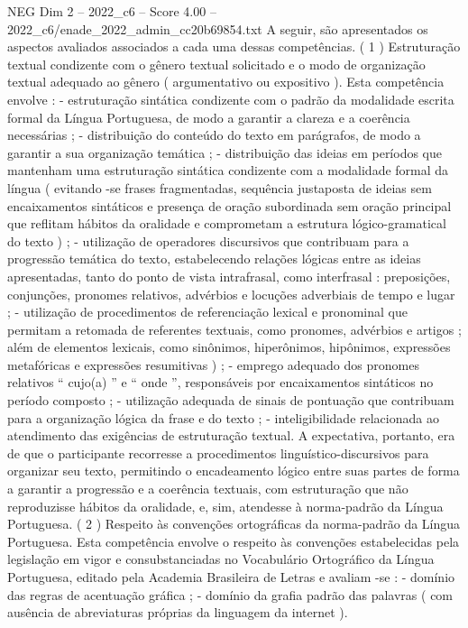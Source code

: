 \begin{textsample}{NEG Dim 2 – 2022\_c6 – Score 4.00 – 2022\_c6/enade\_2022\_admin\_cc20b69854.txt}
A seguir, são apresentados os aspectos avaliados associados a cada uma dessas competências. ( 1 ) Estruturação textual condizente com o gênero textual solicitado e o modo de organização textual adequado ao gênero ( argumentativo ou expositivo ).
Esta competência envolve : - estruturação sintática condizente com o padrão da modalidade escrita formal da Língua Portuguesa, de modo a garantir a clareza e a coerência necessárias ; - distribuição do conteúdo do texto em parágrafos, de modo a garantir a sua organização temática ; - distribuição das ideias em períodos que mantenham uma estruturação sintática condizente com a modalidade formal da língua ( evitando -se frases fragmentadas, sequência justaposta de ideias sem encaixamentos sintáticos e presença de oração subordinada sem oração principal que reflitam hábitos da oralidade e comprometam a estrutura lógico-gramatical do texto ) ; - utilização de operadores discursivos que contribuam para a progressão temática do texto, estabelecendo relações lógicas entre as ideias apresentadas, tanto do ponto de vista intrafrasal, como interfrasal : preposições, conjunções, pronomes relativos, advérbios e locuções adverbiais de tempo e lugar ; - utilização de procedimentos de referenciação lexical e pronominal que permitam a retomada de referentes textuais, como pronomes, advérbios e artigos ; além de elementos lexicais, como sinônimos, hiperônimos, hipônimos, expressões metafóricas e expressões resumitivas ) ; - emprego adequado dos pronomes relativos “ cujo(a) ” e “ onde ”, responsáveis por encaixamentos sintáticos no período composto ; - utilização adequada de sinais de pontuação que contribuam para a organização lógica da frase e do texto ; - inteligibilidade relacionada ao atendimento das exigências de estruturação textual.
A expectativa, portanto, era de que o participante recorresse a procedimentos linguístico-discursivos para organizar seu texto, permitindo o encadeamento lógico entre suas partes de forma a garantir a progressão e a coerência textuais, com estruturação que não reproduzisse hábitos da oralidade, e, sim, atendesse à norma-padrão da Língua Portuguesa. ( 2 ) Respeito às convenções ortográficas da norma-padrão da Língua Portuguesa.
Esta competência envolve o respeito às convenções estabelecidas pela legislação em vigor e consubstanciadas no Vocabulário Ortográfico da Língua Portuguesa, editado pela Academia Brasileira de Letras e avaliam -se : - domínio das regras de acentuação gráfica ; - domínio da grafia padrão das palavras ( com ausência de abreviaturas próprias da linguagem da internet ).

\end{textsample}
